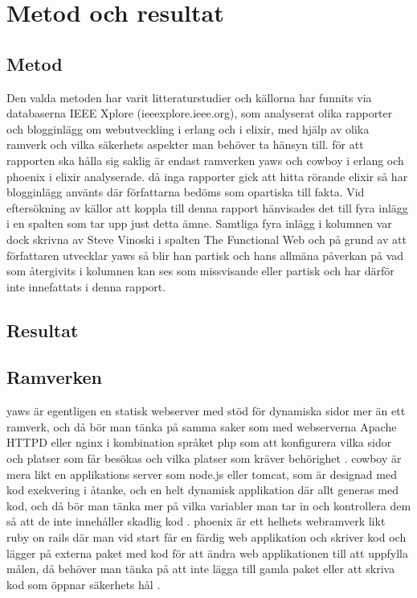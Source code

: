 \documentclass[12pt]{article}
\begin{document}
 
\section{Metod och 	resultat }	

\subsection{ Metod}
Den valda metoden har varit 
litteraturstudier och källorna har funnits
 via databaserna IEEE Xplore 
 (ieeexplore.ieee.org), 
 som analyserat olika rapporter och 
blogginlägg om webutveckling i erlang och i elixir, med hjälp av olika ramverk och vilka säkerhets aspekter man behöver ta hänsyn till. för att rapporten ska hålla sig 
saklig är endast ramverken yaws och cowboy i erlang och phoenix i elixir analyserade. då inga rapporter gick att hitta rörande elixir så har blogginlägg använts där författarna bedöms som opartiska till fakta. Vid eftersökning av källor att koppla till denna rapport hänvisades det till fyra inlägg 
i en spalten som tar upp just detta ämne. Samtliga fyra inlägg i kolumnen var dock skrivna av Steve Vinoski i spalten The Functional Web och på grund av att författaren utvecklar yaws så blir han partisk och hans allmäna påverkan på vad som återgivits i kolumnen kan ses som missvisande eller partisk och har därför inte innefattats i denna rapport.

\subsection{ Resultat}
\subsection*{Ramverken}
yaws är egentligen en statisk webserver med stöd för dynamiska sidor mer än ett ramverk, och då bör man tänka på samma saker som med webserverna Apache HTTPD eller nginx i kombination språket php som att konfigurera vilka sidor och platser som får besökas och vilka platser som kräver behörighet \cite{yaws}. cowboy är mera likt en applikations server som node.js eller tomcat, som är designad med kod exekvering i åtanke, och en helt dynamisk applikation där allt generas med kod, och då bör man tänka mer på vilka variabler man tar in och kontrollera dem så att de inte innehåller skadlig kod \cite{cowboy}. phoenix är ett helhets webramverk likt ruby on rails där man vid start får en färdig web applikation och skriver kod och lägger på externa paket med kod för att ändra web applikationen till att uppfylla målen, då behöver man tänka på att inte lägga till gamla paket eller att skriva kod som öppnar säkerhets hål \cite{phoenix/ruby,phoenix/rails,phoenix}.
\end{document}
